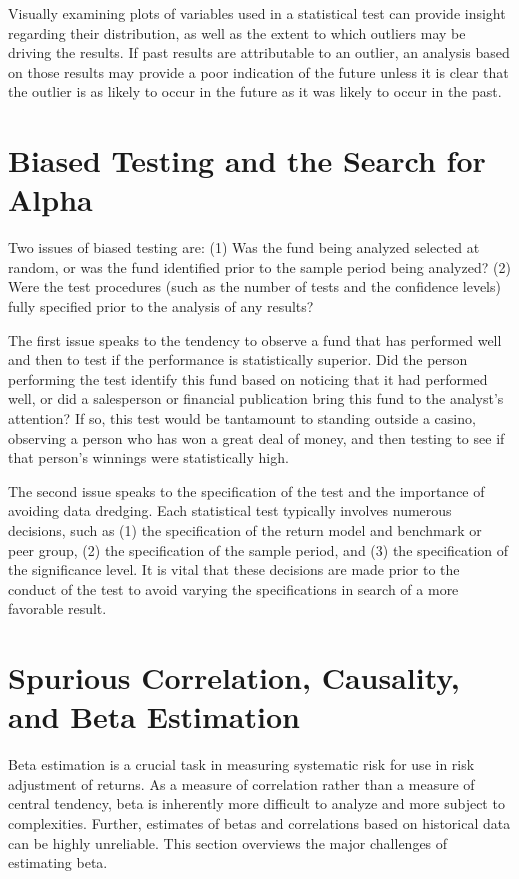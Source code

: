 \documentclass[11pt]{article}
\begin{document}
Visually examining plots of variables used in a statistical test can provide insight regarding their distribution, as well as the extent to which outliers may be driving the results. If past results are attributable to an outlier, an analysis based on those results may provide a poor indication of the future unless it is clear that the outlier is as likely to occur in the future as it was likely to occur in the past.

\section*{Biased Testing and the Search for Alpha}
Two issues of biased testing are: (1) Was the fund being analyzed selected at random, or was the fund identified prior to the sample period being analyzed? (2) Were the test procedures (such as the number of tests and the confidence levels) fully specified prior to the analysis of any results?

The first issue speaks to the tendency to observe a fund that has performed well and then to test if the performance is statistically superior. Did the person performing the test identify this fund based on noticing that it had performed well, or did a salesperson or financial publication bring this fund to the analyst's attention? If so, this test would be tantamount to standing outside a casino, observing a person who has won a great deal of money, and then testing to see if that person's winnings were statistically high.

The second issue speaks to the specification of the test and the importance of avoiding data dredging. Each statistical test typically involves numerous decisions, such as (1) the specification of the return model and benchmark or peer group, (2) the specification of the sample period, and (3) the specification of the significance level. It is vital that these decisions are made prior to the conduct of the test to avoid varying the specifications in search of a more favorable result.

\section*{Spurious Correlation, Causality, and Beta Estimation}
Beta estimation is a crucial task in measuring systematic risk for use in risk adjustment of returns. As a measure of correlation rather than a measure of central tendency, beta is inherently more difficult to analyze and more subject to complexities. Further, estimates of betas and correlations based on historical data can be highly unreliable. This section overviews the major challenges of estimating beta.
\end{document}
